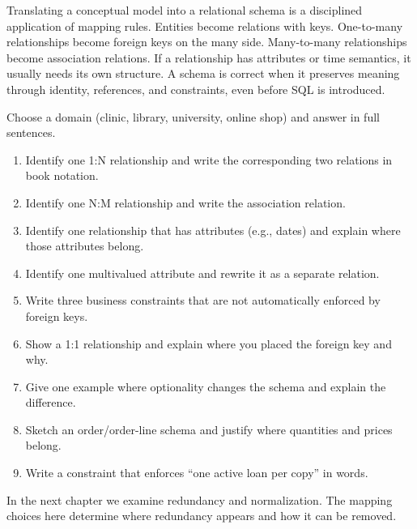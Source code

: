\begin{chaptersummary}
Translating a conceptual model into a relational schema is a disciplined application of mapping rules.
Entities become relations with keys.
One-to-many relationships become foreign keys on the many side.
Many-to-many relationships become association relations.
If a relationship has attributes or time semantics, it usually needs its own structure.
A schema is correct when it preserves meaning through identity, references, and constraints, even before SQL is introduced.
\end{chaptersummary}

\begin{exercisebox}
Choose a domain (clinic, library, university, online shop) and answer in full sentences.
\begin{enumerate}[label=\arabic*.]
  \item Identify one 1:N relationship and write the corresponding two relations in book notation.
  \item Identify one N:M relationship and write the association relation.
  \item Identify one relationship that has attributes (e.g., dates) and explain where those attributes belong.
  \item Identify one multivalued attribute and rewrite it as a separate relation.
  \item Write three business constraints that are not automatically enforced by foreign keys.
  \item Show a 1:1 relationship and explain where you placed the foreign key and why.
  \item Give one example where optionality changes the schema and explain the difference.
  \item Sketch an order/order-line schema and justify where quantities and prices belong.
  \item Write a constraint that enforces “one active loan per copy” in words.
\end{enumerate}
\end{exercisebox}

In the next chapter we examine redundancy and normalization.
The mapping choices here determine where redundancy appears and how it can be removed.
